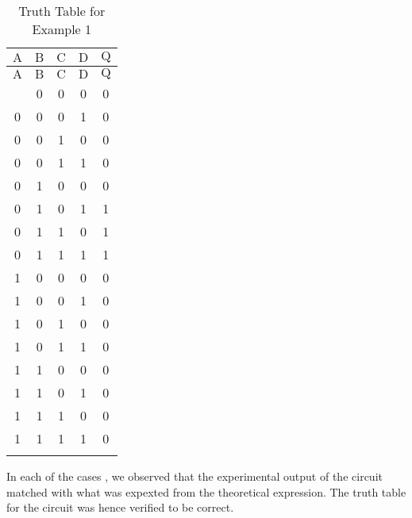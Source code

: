 \documentclass[12pt]{article}
\begin{document}
\begin{longtable}{|c|c|c|c||c|}
	\hline
    $\mathrm{A}$  & $\mathrm{B}$ & $\mathrm{C}$ & $\mathrm{D}$ & $\mathrm{Q}$ \\
  \hline
	\endfirsthead
	\hline
   $\mathrm{A}$  & $\mathrm{B}$ & $\mathrm{C}$ & $\mathrm{D}$ & $\mathrm{Q}$ \\ \hline
	\endhead
	\hline
	\endfoot
	
  \endlastfoot
  0 & 0 & 0 & 0 & 0 \\ \hline
  0 & 0 & 0 & 1 & 0 \\ \hline
  0 & 0 & 1 & 0 & 0 \\ \hline
  0 & 0 & 1 & 1 & 0 \\ \hline
  0 & 1 & 0 & 0 & 0 \\ \hline
  0 & 1 & 0 & 1 & 1 \\ \hline
  0 & 1 & 1 & 0 & 1 \\ \hline
  0 & 1 & 1 & 1 & 1 \\ \hline
  1 & 0 & 0 & 0 & 0 \\ \hline
  1 & 0 & 0 & 1 & 0 \\ \hline
  1 & 0 & 1 & 0 & 0 \\ \hline
  1 & 0 & 1 & 1 & 0 \\ \hline
  1 & 1 & 0 & 0 & 0 \\ \hline
  1 & 1 & 0 & 1 & 0 \\ \hline
  1 & 1 & 1 & 0 & 0 \\ \hline
  1 & 1 & 1 & 1 & 0 \\ \hline
  \caption{Truth Table for Example 1}
  \end{longtable}
\noindent
In each of the cases , we observed that the experimental output of the circuit matched with what was expexted from the theoretical expression. The truth table for the circuit was hence verified to be correct.
\end{document}
